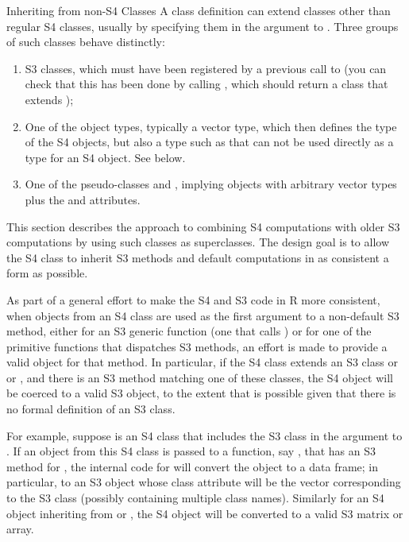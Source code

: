 \begin{Section}{Inheriting from non-S4 Classes}
A class definition can extend classes other than
regular S4 classes, usually by specifying them in the
 argument to .  Three groups
of such classes behave distinctly:
\begin{enumerate}

\item 
S3 classes, which must have been registered by a previous call to
 (you can check that this has been done
by calling , which should return a class that
extends );

\item 
One of the \R{} object types, typically a vector type, which then
defines the type of the S4 objects, but also a type such as
 that can not be used directly as a type
for an S4 object.  See
below.

\item 
One of the pseudo-classes 
and , implying objects with
arbitrary vector types plus the  and 
attributes.

\end{enumerate}


This section describes the approach to combining S4 computations
with older S3 computations by using such classes as superclasses. The
design goal is to allow the S4 class to inherit S3 methods and
default computations in as consistent a form as possible.


As part of a general effort to make the S4 and S3 code in R more
consistent,
when objects from an S4 class are used as the first argument
to a non-default S3 method, either for an S3 generic function (one that calls
) or for one of the primitive functions
that dispatches S3 methods, an effort is made to provide a
valid object for that method.  In
particular, if the S4 class extends an S3 class or 
or , and there is an S3 method matching one of these
classes, the S4 object will be coerced to a valid S3 object, to
the extent that is possible given that there is no formal
definition of an S3 class.

For example, suppose  is an S4 class that
includes the S3 class  in the 
argument to .  If an object from this S4
class is passed to a function, say , that
has an S3 method for , the internal code for
 will convert the object to a data frame;
in particular, to an S3 object whose class attribute will be the vector
corresponding to the S3 class (possibly containing multiple
class names). Similarly for an S4 object inheriting from
 or , the S4 object will be
converted to a valid S3 matrix or array.


\end{Section}
